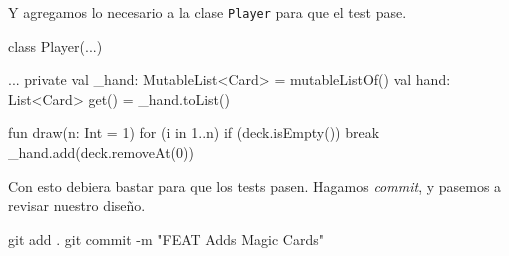   Y agregamos lo necesario a la clase \texttt{Player} para que el test pase.

  \begin{kotlin}
    class Player(...) {
      ...
      private val _hand: MutableList<Card> = mutableListOf()
      val hand: List<Card>
        get() = _hand.toList()
    
      fun draw(n: Int = 1) {
        for (i in 1..n) {
          if (deck.isEmpty()) {
            break
          }
          _hand.add(deck.removeAt(0))
        }
      }
    }
  \end{kotlin}

  Con esto debiera bastar para que los tests pasen.
  Hagamos \textit{commit}, y pasemos a revisar nuestro diseño.

  \begin{powershell}
    git add .
    git commit -m "FEAT Adds Magic Cards"
  \end{powershell}
  